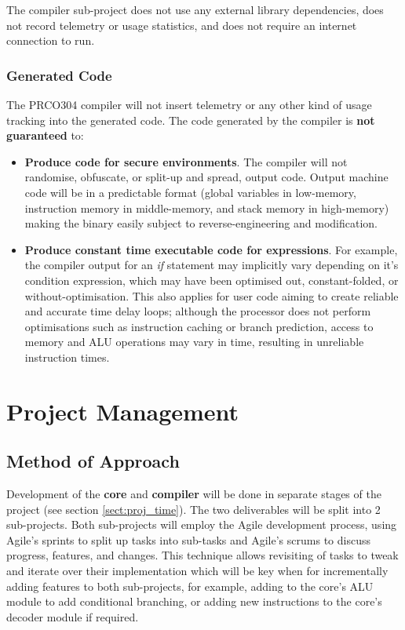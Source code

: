 \documentclass[11pt,a4paper]{report}
\newcommand{\scname}{PRCO304}
\begin{document}
The compiler sub-project does not use any external library dependencies, does not record telemetry or usage statistics, and does not require an internet connection to run.

\subsection{Generated Code}
The \scname{} compiler will not insert telemetry or any other kind of usage tracking into the generated code.
The code generated by the compiler is \textbf{not guaranteed} to:
\begin{itemize}
\item{\textbf{Produce code for secure environments}. The compiler will not randomise, obfuscate, or split-up and spread, output code. Output machine code will be in a predictable format (global variables in low-memory, instruction memory in middle-memory, and stack memory in high-memory) making the binary easily subject to reverse-engineering and modification.}
\item{\textbf{Produce constant time executable code for expressions}. For example, the compiler output for an \textit{if} statement may implicitly vary depending on it's condition expression, which may have been optimised out, constant-folded, or without-optimisation. This also applies for user code aiming to create reliable and accurate time delay loops; although the processor does not perform optimisations such as instruction caching or branch prediction, access to memory and ALU operations may vary in time, resulting in unreliable instruction times.}
\end{itemize}



\chapter{Project Management}
{\hypersetup{linkcolor=black}
\startcontents[chapters]
}

\section{Method of Approach}
Development of the \textbf{core} and \textbf{compiler} will be done in separate stages of the project (see section \ref{sect:proj_time}). The two deliverables will be split into 2 sub-projects. Both sub-projects will employ the Agile development process, using Agile's sprints to split up tasks into sub-tasks and Agile's scrums to discuss progress, features, and changes. This technique allows revisiting of tasks to tweak and iterate over their implementation which will be key when for incrementally adding features to both sub-projects, for example, adding to the core's ALU module to add conditional branching, or adding new instructions to the core's decoder module if required.
\end{document}
